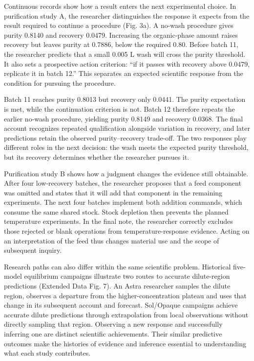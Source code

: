 \documentclass[12pt,a4paper]{article}
\begin{document}
Continuous records show how a result enters the next experimental choice. In purification study A, the researcher distinguishes the response it expects from the result required to continue a procedure (Fig. 3a). A no-wash procedure gives purity 0.8140 and recovery 0.0479. Increasing the organic-phase amount raises recovery but leaves purity at 0.7886, below the required 0.80. Before batch 11, the researcher predicts that a small 0.005 L wash will cross the purity threshold. It also sets a prospective action criterion: ``if it passes with recovery above 0.0479, replicate it in batch 12.'' This separates an expected scientific response from the condition for pursuing the procedure.

Batch 11 reaches purity 0.8013 but recovery only 0.0441. The purity expectation is met, while the continuation criterion is not. Batch 12 therefore repeats the earlier no-wash procedure, yielding purity 0.8149 and recovery 0.0368. The final account recognizes repeated qualification alongside variation in recovery, and later predictions retain the observed purity--recovery trade-off. The two responses play different roles in the next decision: the wash meets the expected purity threshold, but its recovery determines whether the researcher pursues it.

Purification study B shows how a judgment changes the evidence still obtainable. After four low-recovery batches, the researcher proposes that a feed component was omitted and states that it will add that component in the remaining experiments. The next four batches implement both addition commands, which consume the same shared stock. Stock depletion then prevents the planned temperature experiments. In the final note, the researcher correctly excludes those rejected or blank operations from temperature-response evidence. Acting on an interpretation of the feed thus changes material use and the scope of subsequent inquiry.

Research paths can also differ within the same scientific problem. Historical five-model equilibrium campaigns illustrate two routes to accurate dilute-region predictions (Extended Data Fig. 7). An Astra researcher samples the dilute region, observes a departure from the higher-concentration plateau and uses that change in its subsequent account and forecast. Sol/Opaque campaigns achieve accurate dilute predictions through extrapolation from local observations without directly sampling that region. Observing a new response and successfully inferring one are distinct scientific achievements. Their similar predictive outcomes make the histories of evidence and inference essential to understanding what each study contributes.
\end{document}

